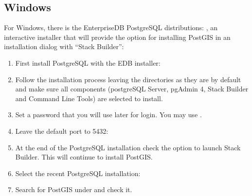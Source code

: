 \documentclass[a4paper,11pt,english]{sphinxmanual}
\begin{document}
\subsection{Windows}
\label{\detokenize{installation_win:windows}}\label{\detokenize{installation_win:installation-win}}\label{\detokenize{installation_win::doc}}
For Windows, there is the EnterpriseDB PostgreSQL distributions: , an interactive installer that will provide the option for installing PostGIS in an installation dialog with “Stack Builder”:
\begin{enumerate}
\def\theenumi{\arabic{enumi}}
\def\labelenumi{\theenumi .}
\makeatletter\def\p@enumii{\p@enumi \theenumi .}\makeatother
\item {} 
First install PostgreSQL with the EDB installer:

\noindent{}

\item {} 
Follow the installation process leaving the directories as they are by default and make sure all components (postgreSQL Server, pgAdmin 4, Stack Builder and Command Line Tools) are selected to install.

\noindent{}

\item {} 
Set a password that you will use later for login. You may use .

\noindent{}

\item {} 
Leave the default port to 5432:

\noindent{}

\item {} 
At the end of the PostgreSQL installation check the option to launch Stack Builder. This will continue to install PostGIS.

\noindent{}

\item {} 
Select the recent PostgreSQL installation:

\noindent{}

\item {} 
Search for PostGIS under  and check it.

\noindent{}


\end{enumerate}
\end{document}
